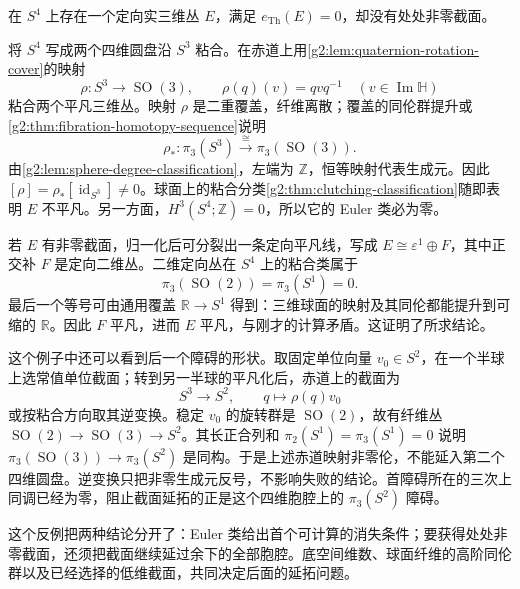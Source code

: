 \begin{example}\label{g2:ex:zero-euler-no-section}
	在 \(S^4\) 上存在一个定向实三维丛 \(E\)，满足 \(e_{\mathrm{Th}}(E)=0\)，却没有处处非零截面。

	将 \(S^4\) 写成两个四维圆盘沿 \(S^3\) 粘合。在赤道上用\cref{g2:lem:quaternion-rotation-cover}的映射
	\[
		\rho:S^3\longrightarrow\operatorname{SO}(3),\qquad
		\rho(q)(v)=qvq^{-1}\quad(v\in\operatorname{Im}\mathbb H)
	\]
	粘合两个平凡三维丛。映射 \(\rho\) 是二重覆盖，纤维离散；覆盖的同伦群提升或\cref{g2:thm:fibration-homotopy-sequence}说明
	\[
		\rho_*:\pi_3(S^3)\xrightarrow{\ \cong\ }\pi_3(\operatorname{SO}(3)).
	\]
	由\cref{g2:lem:sphere-degree-classification}，左端为 \(\mathbb Z\)，恒等映射代表生成元。因此 \([\rho]=\rho_*[\operatorname{id}_{S^3}]\ne0\)。球面上的粘合分类\cref{g2:thm:clutching-classification}随即表明 \(E\) 不平凡。另一方面，\(H^3(S^4;\mathbb Z)=0\)，所以它的 Euler 类必为零。

	若 \(E\) 有非零截面，归一化后可分裂出一条定向平凡线，写成 \(E\cong\varepsilon^1\oplus F\)，其中正交补 \(F\) 是定向二维丛。二维定向丛在 \(S^4\) 上的粘合类属于
	\[
		\pi_3(\operatorname{SO}(2))=\pi_3(S^1)=0.
	\]
	最后一个等号可由通用覆盖 \(\mathbb R\to S^1\) 得到：三维球面的映射及其同伦都能提升到可缩的 \(\mathbb R\)。因此 \(F\) 平凡，进而 \(E\) 平凡，与刚才的计算矛盾。这证明了所求结论。

	这个例子中还可以看到后一个障碍的形状。取固定单位向量 \(v_0\in S^2\)，在一个半球上选常值单位截面；转到另一半球的平凡化后，赤道上的截面为
	\[
		S^3\longrightarrow S^2,\qquad q\longmapsto\rho(q)v_0
	\]
	或按粘合方向取其逆变换。稳定 \(v_0\) 的旋转群是 \(\operatorname{SO}(2)\)，故有纤维丛 \(\operatorname{SO}(2)\to\operatorname{SO}(3)\to S^2\)。其长正合列和 \(\pi_2(S^1)=\pi_3(S^1)=0\) 说明 \(\pi_3(\operatorname{SO}(3))\to\pi_3(S^2)\) 是同构。于是上述赤道映射非零伦，不能延入第二个四维圆盘。逆变换只把非零生成元反号，不影响失败的结论。首障碍所在的三次上同调已经为零，阻止截面延拓的正是这个四维胞腔上的 \(\pi_3(S^2)\) 障碍。
\end{example}

这个反例把两种结论分开了：Euler 类给出首个可计算的消失条件；要获得处处非零截面，还须把截面继续延过余下的全部胞腔。底空间维数、球面纤维的高阶同伦群以及已经选择的低维截面，共同决定后面的延拓问题。

